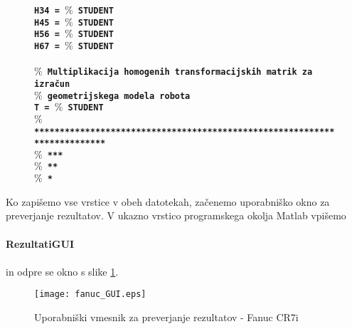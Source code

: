 \begin{figure}[h]
\textbf{\texttt{\hspace*{1cm}H34 = \textcolor[rgb]{0.13,0.55,0.13}{$\%$ STUDENT}}}\\ %
\textbf{\texttt{\hspace*{1cm}H45 = \textcolor[rgb]{0.13,0.55,0.13}{$\%$ STUDENT}}}\\ %
\textbf{\texttt{\hspace*{1cm}H56 = \textcolor[rgb]{0.13,0.55,0.13}{$\%$ STUDENT}}}\\ %
\textbf{\texttt{\hspace*{1cm}H67 = \textcolor[rgb]{0.13,0.55,0.13}{$\%$ STUDENT}}}\\ %
\\ %
\textcolor[rgb]{0.13,0.55,0.13}{\textbf{\texttt{$\%$ Multiplikacija homogenih transformacijskih matrik za izračun}}}\\ %
\textcolor[rgb]{0.13,0.55,0.13}{\textbf{\texttt{$\%$ geometrijskega modela robota}}}\\ %
\textbf{\texttt{\hspace*{1cm}T = \textcolor[rgb]{0.13,0.55,0.13}{$\%$ STUDENT}}}\\ %
\textcolor[rgb]{0.13,0.55,0.13}{\textbf{\texttt{$\%$ *************************************************************************}}}\\ %
\textcolor[rgb]{0.13,0.55,0.13}{\textbf{\texttt{$\%$ ***}}}\\ %
\textcolor[rgb]{0.13,0.55,0.13}{\textbf{\texttt{$\%$ **}}}\\ %
\textcolor[rgb]{0.13,0.55,0.13}{\textbf{\texttt{$\%$ *}}}\\ %
\end{figure}
\vspace{-0.1cm} %

Ko zapišemo vse vrstice v obeh datotekah, začenemo
uporabniško okno za preverjanje rezultatov. V ukazno vrstico programskega okolja Matlab vpišemo\\
\vspace{-0.2cm}\\%
\textbf{RezultatiGUI} \\ %
\vspace{-0.2cm}\\%
in odpre se okno s slike \ref{fGUI_CR7}.

\begin{figure}[h]
    \centering
    \texttt{[image: fanuc\_GUI.eps]}
    \vspace{-0.3cm}
    \caption{Uporabniški vmesnik za preverjanje rezultatov - Fanuc CR7i}
    \label{fGUI_CR7}
\end{figure}

